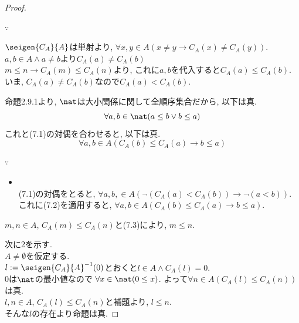 \begin{proof}
\begin{itemize}
\begin{sub-block}{{\boldmath $\because$}\,}
\begin{itemize}
              $\seigen{C_A}{A}$は単射より,
              $\forall x, y \in A (x \neq y \rightarrow C_A(x) \neq C_A(y))$.\\
              $a,b \in A \land a \neq b$より$C_A(a) \neq C_A(b)$\\
              $m \leq n \rightarrow C_A(m) \leq C_A(n)$より,
              これに$a,b$を代入すると$C_A(a) \leq C_A(b)$.\\
              いま,
              $C_A(a) \neq C_A(b)$なので$C_A(a) < C_A(b)$.
          \end{itemize}
        \end{sub-block}
        命題2.9.1より,
        $\nat$は大小関係に関して全順序集合だから,
        以下は真.
        \begin{equation}
          \forall a, b \in \nat (a \leq b \lor b \leq a )
        \end{equation}
        これと(7.1)の対偶を合わせると,
        以下は真.
        \begin{equation}
            \forall a,b \in A(C_A(b) \leq C_A(a) \rightarrow b \leq a)
        \end{equation}
        \begin{sub-block}{{\boldmath $\because$}\,}
          \begin{itemize}
            \item[] \hspace{-0.5cm} \\
              (7.1)の対偶をとると,
              $\forall a, b, \in A(\lnot (C_A(a) < C_A(b)) \rightarrow \lnot (a < b))$.\\
              これに(7.2)を適用すると,
              $\forall a,b \in A(C_A(b) \leq C_A(a) \rightarrow b \leq a).$
          \end{itemize}
        \end{sub-block}
        $m,n \in A$,
        $C_A(m) \leq C_A(n)$と(7.3)により,
        $m \leq n$.
  \end{itemize}
  次に2を示す.\\
  $A \neq \emptyset$を仮定する.\\
  $l := \seigen{C_A}{A}^{-1}(0)$とおくと$l \in A \land C_A(l) = 0$.\\
  $0$は$\nat$の最小値なので
  $\forall x \in \nat (0 \leq x)$.
  よって$\forall n \in A (C_A(l) \leq C_A(n))$は真.\\
  $l,n \in A$,
  $C_A(l) \leq C_A(n)$と補題より,
  $l \leq n$.\\
  そんな$l$の存在より命題は真.
\end{proof}

